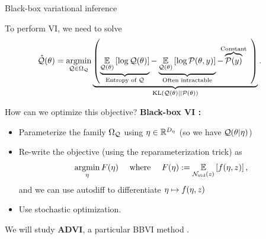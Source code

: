 \documentclass[8pt]{beamer}\usepackage[]{graphicx}\usepackage[]{color}
\begin{document}
\begin{frame}[t]{Black-box variational inference}

To perform VI, we need to solve
%
\begin{align*}
%
\qstar(\theta) &= \argmin_{\q \in \qdom} 
\undernote{
\left( 
\undernote{
    \expect{\q(\theta)}{\log \q(\theta)}
    }{\textrm{Entropy of }\q} - 
\undernote{
    \expect{\q(\theta)}{\log \p(\theta, \y)}
}{\textrm{Often intractable}}
 - \overnote{\p(\y)}{\textrm{Constant}}
\quad\right)}{\kl{\q(\theta)}{\p(\theta)}}.
%
\end{align*}

How can we optimize this objective?
\pause
\textbf{Black-box VI \citep{ranganath:2014:bbvi}: }
%
\begin{itemize}
    \item Parameterize the family $\Omega_{\mathcal{Q}}$ using $\eta \in \mathbb{R}^{{D_{\eta}}}$ (so we have $\mathcal{Q}(\theta \vert \eta)$)
    \item Re-write the objective (using the reparameterization trick) as 
    \begin{align*}
        \operatorname*{\mathrm{argmin}}_{\eta} F(\eta)
        \quad\text{ where }\quad F(\eta) := \underset{\mathcal{N}_{\mathrm{std}}\left(z\right)}{\mathbb{E}}\left[f(\eta, z)\right],
    \end{align*}
    and we can use autodiff to differentiate $\eta \mapsto f(\eta, z)$
    \item Use stochastic optimization.
\end{itemize}




We will study \textbf{ADVI}, a particular BBVI method
\citep{kucukelbir:2017:advi}.



\end{frame}
\end{document}
